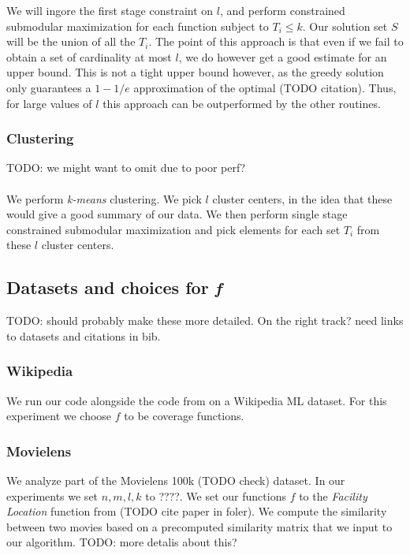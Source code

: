 We will ingore the first stage constraint on $l$, and perform constrained submodular maximization for each function subject to $T_i \leq k$. Our solution set $S$ will be the union of all the $T_i$. The point of this approach is that even if we fail to obtain a set of cardinality at most $l$, we do however get a good estimate for an upper bound. This is not a tight upper bound however, as the greedy solution only guarantees a $1-1/e$ approximation of the optimal (TODO citation). Thus, for large values of $l$ this approach can be outperformed by the other routines. 

\subsubsection{Clustering}

TODO: we might want to omit due to poor perf? \\
\\
We perform \textit{k-means} clustering. We pick $l$ cluster centers, in the idea that these would give a good summary of our data. We then perform single stage constrained submodular maximization and pick elements for each set $T_i$ from these $l$ cluster centers.

\subsection{Datasets and choices for \textit{f}}

TODO: should probably make these more detailed. On the right track? need links to datasets and citations in bib. 

\subsubsection{Wikipedia}

We run our code alongside the code from \cite{balkanski16learning} on a Wikipedia ML dataset. For this experiment we choose $f$ to be coverage functions.

\subsubsection{Movielens}

We analyze part of the Movielens 100k (TODO check) dataset. In our experiments we set $n,m,l,k$ to ????. We set our functions $f$ to the \textit{Facility Location} function from (TODO cite paper in foler). We compute the similarity between two movies based on a precomputed similarity matrix that we input to our algorithm. TODO: more detalis about this?

